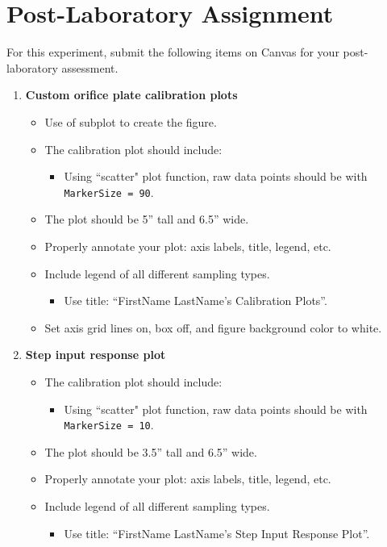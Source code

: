 \documentclass{article} %
\begin{document}
\section{Post-Laboratory Assignment}
For this experiment, submit the following items on Canvas for your post-laboratory assessment. 
\begin{enumerate}
    \item \textbf{Custom orifice plate calibration plots}
    \begin{itemize}
        \item Use of subplot to create the figure.
        \item The calibration plot should include:
        \begin{itemize}
            \item Using ``scatter" plot function, raw data points should be with \texttt{MarkerSize = 90}.
        \end{itemize} 
        \item The plot should be 5'' tall and 6.5'' wide.
        \item Properly annotate your plot: axis labels, title, legend, etc.
        \item Include legend of all different sampling types.
        \begin{itemize}
            \item Use title: ``FirstName LastName's Calibration Plots''.
        \end{itemize}
        \item Set axis grid lines on, box off, and figure background color to white.
    \end{itemize}
    \item \textbf{Step input response plot}
    \begin{itemize}
        \item The calibration plot should include:
        \begin{itemize}
            \item Using ``scatter" plot function, raw data points should be with \texttt{MarkerSize = 10}.
        \end{itemize} 
        \item The plot should be 3.5'' tall and 6.5'' wide.
        \item Properly annotate your plot: axis labels, title, legend, etc.
        \item Include legend of all different sampling types.
        \begin{itemize}
            \item Use title: ``FirstName LastName's Step Input Response Plot''.

\end{itemize}
\end{itemize}
\end{enumerate}
\end{document}
